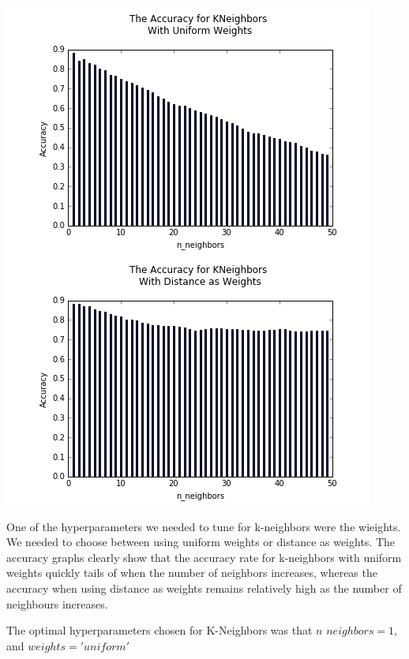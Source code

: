 \documentclass{article}
\begin{document}
\includegraphics[scale=0.6]{k-nboors}

One of the hyperparameters we needed to tune for k-neighbors were the wieights. We needed to choose between using uniform weights or distance as weights. The accuracy graphs clearly show that the accuracy rate for k-neighbors with uniform weights quickly tails of when the number of neighbors increases, whereas the accuracy when using distance as weights remains relatively high as the number of neighbours increases. 

The optimal hyperparameters chosen for K-Neighbors was that $n$ \textunderscore $neighbors = 1,$ and $weights = 'uniform'$




\end{document}
